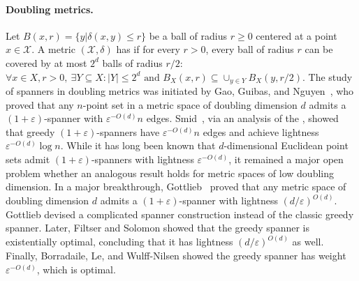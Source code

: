 \documentclass[11pt]{article}
\newcommand{\cX}{\mathcal{X}}
\newcommand{\ddim}{\ensuremath{d}}
\newcommand{\atodo}[1]{\todo[linecolor=red,backgroundcolor=green!25,bordercolor=red]{\textbf{AF:~}#1}}
\begin{document}
\paragraph{Doubling metrics.} Let $B(x,r) = \{y | \delta(x,y)\leq r\}$ be a ball of radius $r\geq 0$ centered at a point $x\in \cX$. A metric $(\cX,\delta)$ has \EMPH{doubling dimension $\ddim$} if for every $r > 0$, every ball of radius $r$ can be covered by at most $2^{\ddim}$ balls of radius $r/2$: $\forall x\in X, r > 0,~\exists Y\subseteq X: |Y|\leq 2^{\ddim} \text{ and } B_X(x,r) \subseteq \cup_{y\in Y} B_X(y,r/2)$. 
The study of spanners in doubling metrics was initiated by Gao, Guibas, and Nguyen~\cite{gao2004deformable}, who proved that any $n$-point set in a metric space of doubling dimension $\ddim$ admits a $(1+\varepsilon)$-spanner with $\varepsilon^{-O(\ddim)} n$ edges.
Smid~\cite{smid2009weak}, via an analysis of the , showed that greedy $(1+\varepsilon)$-spanners have $\varepsilon^{-O(\ddim)} n$ edges and achieve lightness $\varepsilon^{-O(\ddim)} \log n$. While it has long been known that $d$-dimensional Euclidean point sets admit $(1+\varepsilon)$-spanners with lightness $\varepsilon^{-O(d)}$, it remained a major open problem whether an analogous result holds for metric spaces of low doubling dimension. 
In a major breakthrough, Gottlieb~\cite{gottlieb2015light} proved that any metric space of doubling dimension $\ddim$ admits a $(1+\varepsilon)$-spanner with lightness $(\ddim/\varepsilon)^{O(\ddim)}$. 
Gottlieb devised a complicated spanner construction instead of the classic greedy spanner.
Later, Filtser and Solomon \cite{FS20} showed that the greedy spanner is existentially optimal, concluding that it has lightness $(\ddim/\varepsilon)^{O(\ddim)}$ as well.
Finally, Borradaile, Le, and Wulff-Nilsen \cite{BLW19} showed the greedy spanner has
weight $\varepsilon^{-O(\ddim)}$, which is optimal.
\end{document}

